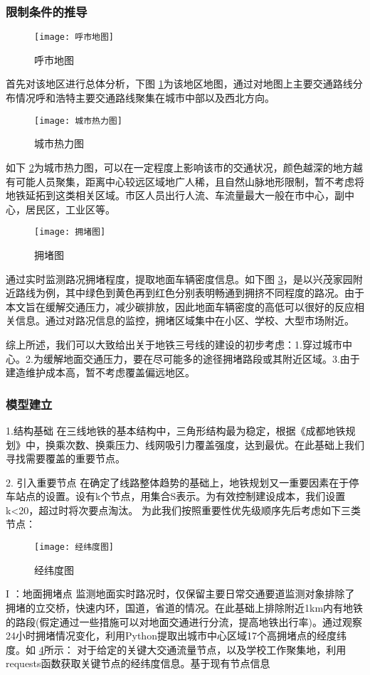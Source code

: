 \documentclass[12pt,a4paper]{mcmthesis}
\begin{document}
\subsubsection{限制条件的推导}
\begin{figure}[h!t]
	\centerline{\texttt{[image: 呼市地图]}\quad
	}
	\caption{\song\wuhao
		呼市地图}
	\label{fig:呼市地图}
\end{figure}
首先对该地区进行总体分析，下图 \ref{fig:呼市地图}为该地区地图，通过对地图上主要交通路线分布情况呼和浩特主要交通路线聚集在城市中部以及西北方向。
\begin{figure}[h!t]
	\centerline{\texttt{[image: 城市热力图]}\quad
	}
	\caption{\song\wuhao
		城市热力图}
	\label{fig:城市热力图}
\end{figure}
如下 \ref{fig:城市热力图}为城市热力图，可以在一定程度上影响该市的交通状况，颜色越深的地方越有可能人员聚集，距离中心较远区域地广人稀，且自然山脉地形限制，暂不考虑将地铁延拓到这类相关区域。市区人员出行人流、车流量最大一般在市中心，副中心，居民区，工业区等。
\begin{figure}[h!t]
	\centerline{\texttt{[image: 拥堵图]}\quad
	}
	\caption{\song\wuhao
		拥堵图}
	\label{fig:拥堵图}
\end{figure}


通过实时监测路况拥堵程度，提取地面车辆密度信息。如下图 \ref{fig:拥堵图}，是以兴茂家园附近路线为例，其中绿色到黄色再到红色分别表明畅通到拥挤不同程度的路况。由于本文旨在缓解交通压力，减少碳排放，因此地面车辆密度的高低可以很好的反应相关信息。通过对路况信息的监控，拥堵区域集中在小区、学校、大型市场附近。

综上所述，我们可以大致给出关于地铁三号线的建设的初步考虑：1.穿过城市中心。2.为缓解地面交通压力，要在尽可能多的途径拥堵路段或其附近区域。3.由于建造维护成本高，暂不考虑覆盖偏远地区。

\subsubsection{模型建立}
1.结构基础
在三线地铁的基本结构中，三角形结构最为稳定，根据《成都地铁规划》中，换乘次数、换乘压力、线网吸引力覆盖强度，达到最优。在此基础上我们寻找需要覆盖的重要节点。

2.	引入重要节点
在确定了线路整体趋势的基础上，地铁规划又一重要因素在于停车站点的设置。设有k个节点，用集合S表示。为有效控制建设成本，我们设置k<20，超过时将次要点淘汰。
为此我们按照重要性优先级顺序先后考虑如下三类节点：

\begin{figure}[h!t]
	\centerline{\texttt{[image: 经纬度图]}\quad
	}
	\caption{\song\wuhao
		经纬度图}
	\label{fig:经纬度图}
\end{figure}
I ：地面拥堵点
监测地面实时路况时，仅保留主要日常交通要道监测对象排除了拥堵的立交桥，快速内环，国道，省道的情况。在此基础上排除附近1km内有地铁的路段(假定通过一些措施可以对地面交通进行分流，提高地铁出行率)。通过观察24小时拥堵情况变化，利用Python提取出城市中心区域17个高拥堵点的经度纬度。如 \ref{fig:经纬度图}所示：
对于给定的关键大交通流量节点，以及学校工作聚集地，利用requests函数获取关键节点的经纬度信息。基于现有节点信息
\end{document}
